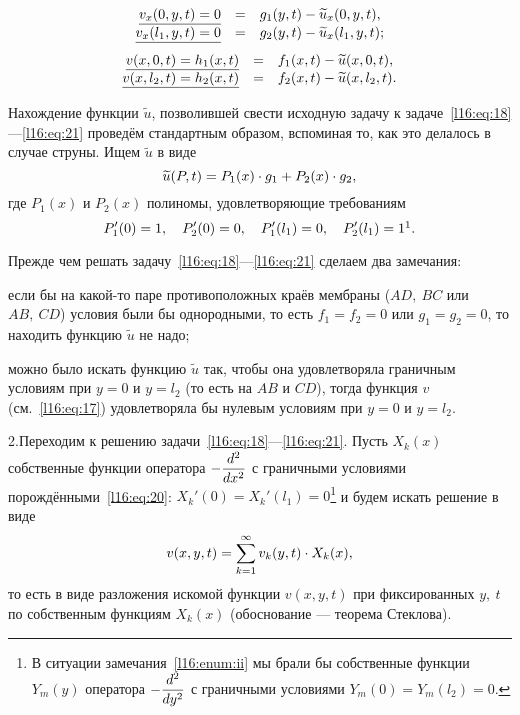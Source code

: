 \begin{equation}\label{l16:eq:20}
	\hfill\begin{array}{rcl}
		\underline{v_x(0,y,t)=0}&=&g_1(y,t)-\widetilde{u}_x(0,y,t),\\
		\underline{v_x(l_1,y,t)=0}&=&g_2(y,t)-\widetilde{u}_x(l_1,y,t);
	\end{array} \hfill
\end{equation}
\begin{equation}\label{l16:eq:21}
	\hfill\begin{array}{rcl}
		\underline{v(x,0,t)=h_1(x,t)}&=&f_1(x,t)-\widetilde{u}(x,0,t),\\
		\underline{v(x,l_2,t)=h_2(x,t)}&=&f_2(x,t)-\widetilde{u}(x,l_2,t).
	\end{array} \hfill
\end{equation}

Нахождение функции $\widetilde{u}$, позволившей свести исходную задачу к задаче~\eqref{l16:eq:18}---\eqref{l16:eq:21} проведём стандартным образом, вспоминая то, как это делалось в случае струны. Ищем $\widetilde{u}$ в виде
\begin{equation*}
	\hfill\widetilde{u}(P,t)=P_1(x)\cdot g_1+P_2(x)\cdot g_2,\hfill
\end{equation*}
где $P_1(x)$ и $P_2(x)$ полиномы, удовлетворяющие требованиям 
\begin{equation*}
	\hfill P'_1(0)=1,\quad P'_2(0)=0,\quad P'_1(l_1)=0,\quad P'_2(l_1)=1\footnotemark{}.\hfill
\end{equation*}

Прежде чем решать задачу~\eqref{l16:eq:18}---\eqref{l16:eq:21} сделаем два замечания:
\begin{enumeraterm}
	\item если бы на какой-то паре противоположных краёв мембраны ($AD,\ BC$ или $AB,\ CD$) условия были бы однородными, то есть $f_1=f_2=0$ или $g_1=g_2=0$, то находить функцию $\widetilde{u}$ не надо;
	\item\label{l16:enum:ii} можно было искать функцию $\widetilde{u}$ так, чтобы она удовлетворяла граничным условиям при $y=0$ и $y=l_2$ (то есть на $AB$ и $CD$), тогда функция $v$ (см.~\eqref{l16:eq:17}) удовлетворяла бы нулевым условиям при $y=0$ и $y=l_2$.
\end{enumeraterm}
2.\quad Переходим к решению задачи~\eqref{l16:eq:18}---\eqref{l16:eq:21}. Пусть $X_k(x)$ собственные функции оператора $\displaystyle-\frac{d^2}{dx^2}$ с граничными условиями порождёнными~\eqref{l16:eq:20}: $X_k'(0)=X_k'(l_1)=0$\footnote{В ситуации замечания~\ref{l16:enum:ii} мы брали бы собственные функции $Y_m(y)$ оператора $-\displaystyle\frac{d^2}{dy^2}$ с граничными условиями $Y_m(0)=Y_m(l_2)=0$.} и будем искать решение в виде 
\begin{equation}\label{l16:eq:22}
	\hfill v(x,y,t)=\sum\limits_{k=1}^{\infty}v_k(y,t)\cdot X_k(x),\hfill
\end{equation}
то есть в виде разложения искомой функции $v(x,y,t)$ при фиксированных $y,\ t$ по собственным функциям $X_k(x)$ (обоснование --- теорема Стеклова).

